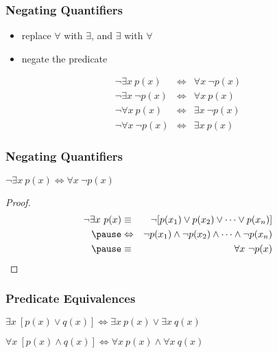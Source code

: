 \documentclass[dvipsnames]{beamer}
\begin{document}
\begin{frame}
  \frametitle{Negating Quantifiers}

  \begin{itemize}
    \item replace $\forall$ with $\exists$, and $\exists$ with $\forall$
    \item negate the predicate
  \end{itemize}

  \pause
  \begin{eqnarray*}
    \neg \exists x~p(x)      & \Leftrightarrow & \forall x~\neg p(x)\\
    \neg \exists x~\neg p(x) & \Leftrightarrow & \forall x~p(x)\\
    \neg \forall x~p(x)      & \Leftrightarrow & \exists x~\neg p(x)\\
    \neg \forall x~\neg p(x) & \Leftrightarrow & \exists x~p(x)
  \end{eqnarray*}
\end{frame}

\begin{frame}
  \frametitle{Negating Quantifiers}

  \begin{theorem}
    $\neg \exists x~p(x) \Leftrightarrow \forall x~\neg p(x)$
  \end{theorem}

  \pause
  \begin{proof}
    \begin{eqnarray*}
      \neg \exists x~p(x) & \equiv          & \neg [p(x_1) \vee p(x_2) \vee \cdots
                                              \vee p(x_n)]\\\pause
                          & \Leftrightarrow & \neg p(x_1) \wedge \neg p(x_2) \wedge \cdots
                                              \wedge \neg p(x_n)\\\pause
                          & \equiv          & \forall x~\neg p(x)
    \end{eqnarray*}
  \end{proof}
\end{frame}

\begin{frame}
  \frametitle{Predicate Equivalences}

  \begin{theorem}
    $\exists x~[p(x) \vee q(x)]
      \Leftrightarrow \exists x~p(x) \vee \exists x~q(x)$
  \end{theorem}

  \pause
  \begin{theorem}
    $\forall x~[p(x) \wedge q(x)]
      \Leftrightarrow \forall x~p(x) \wedge \forall x~q(x)$
  \end{theorem}
\end{frame}
\end{document}
